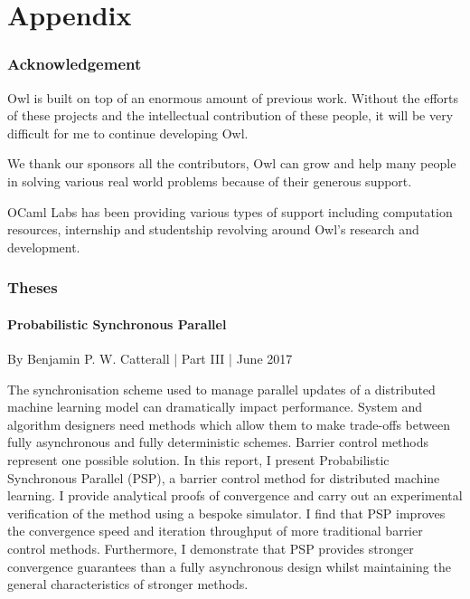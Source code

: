 \part{Appendix}

\newpage



\hypertarget{Acknowledgement}{%
\section{Acknowledgement}\label{acknowledgement}}

Owl is built on top of an enormous amount of previous work. Without the efforts of these projects and the intellectual contribution of these people, it will be very difficult for me to continue developing Owl.

We thank our sponsors all the contributors, Owl can grow and help many people in solving various real world problems because of their generous support. 

OCaml Labs has been providing various types of support including computation resources, internship and studentship revolving around Owl’s research and development.



\newpage



\hypertarget{Theses}{%
\section{Theses}\label{theses}}

\hypertarget{Probabilistic Synchronous Parallel}{%
\subsection{Probabilistic Synchronous Parallel}\label{theses-psp}}

By Benjamin P. W. Catterall | Part III | June 2017

The synchronisation scheme used to manage parallel updates of a distributed machine learning model can dramatically impact performance. System and algorithm designers need methods which allow them to make trade-offs between fully asynchronous and fully deterministic schemes. Barrier control methods represent one possible solution. In this report, I present Probabilistic Synchronous Parallel (PSP), a barrier control method for distributed machine learning. I provide analytical proofs of convergence and carry out an experimental verification of the method using a bespoke simulator. I find that PSP improves the convergence speed and iteration throughput of more traditional barrier control methods. Furthermore, I demonstrate that PSP provides stronger convergence guarantees than a fully asynchronous design whilst maintaining the general characteristics of stronger methods.


